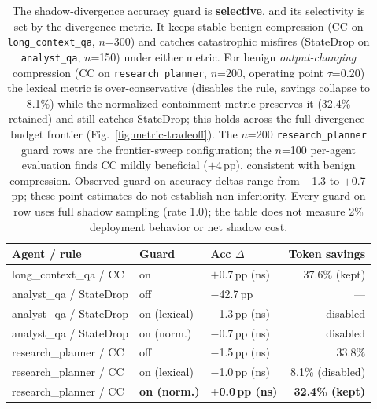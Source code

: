 \begin{table}[t]
\caption{The shadow-divergence accuracy guard is \textbf{selective}, and its selectivity
is set by the divergence metric. It keeps stable benign compression (CC on
\texttt{long\_context\_qa}, $n$=300) and catches catastrophic misfires (StateDrop on
\texttt{analyst\_qa}, $n$=150) under either metric. For benign \textit{output-changing}
compression (CC on \texttt{research\_planner}, $n$=200, operating point $\tau$=0.20) the
lexical metric is over-conservative (disables the rule, savings collapse to 8.1\%) while the
normalized containment metric preserves it (32.4\% retained) and still catches StateDrop;
this holds across the full divergence-budget frontier (Fig.~\ref{fig:metric-tradeoff}). The
$n$=200 \texttt{research\_planner} guard rows are the frontier-sweep configuration; the
$n$=100 per-agent evaluation finds CC mildly beneficial ($+$4\,pp), consistent with benign
compression. Observed guard-on accuracy deltas range from $-$1.3 to $+$0.7\,pp;
these point estimates do not establish non-inferiority. Every guard-on row uses
full shadow sampling (rate 1.0); the table does not measure
2\% deployment behavior or net shadow cost.}
\label{tab:guard}
\small
\begin{tabular}{lllr}
\toprule
Agent / rule & Guard & Acc $\Delta$ & Token savings \\
\midrule
long\_context\_qa / CC  & on            & $+$0.7\,pp (ns) & 37.6\% (kept) \\
analyst\_qa / StateDrop & off           & $-$42.7\,pp     & --- \\
analyst\_qa / StateDrop & on (lexical)  & $-$1.3\,pp (ns) & disabled \\
analyst\_qa / StateDrop & on (norm.)    & $-$0.7\,pp (ns) & disabled \\
research\_planner / CC  & off           & $-$1.5\,pp (ns) & 33.8\% \\
research\_planner / CC  & on (lexical)  & $-$1.0\,pp (ns) & 8.1\% (disabled) \\
research\_planner / CC  & \textbf{on (norm.)} & \textbf{$\pm$0.0\,pp (ns)} & \textbf{32.4\% (kept)} \\
\bottomrule
\end{tabular}
\end{table}

